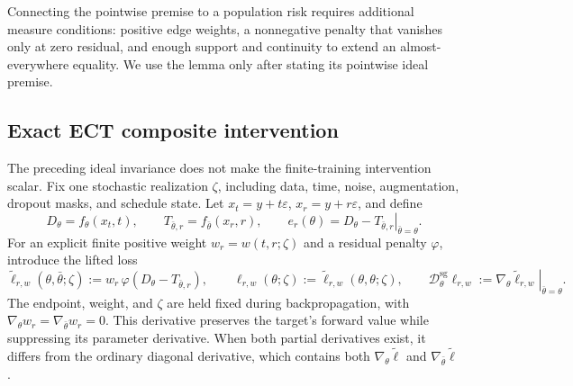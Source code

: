 \documentclass{article}
\newif\ifshowcomments
\newcommand{\theorynote}[1]{%
  \ifshowcomments{\color{theoryblue}\textbf{[THEORY CHECK: #1]}}\fi}
\newcommand{\Dsg}{\mathcal{D}^{\mathrm{sg}}_\theta}
\begin{document}
Connecting the pointwise premise to a population risk requires additional
measure conditions: positive edge weights, a nonnegative penalty that vanishes
only at zero residual, and enough support and continuity to extend an
almost-everywhere equality. We use the lemma only after stating its pointwise
ideal premise.

\theorynote{Keep the lemma on latent trajectories and retain the asymptotic
anchor case. Do not silently upgrade feasibility of zero pathwise residuals
into a property of the actual ECT population minimizer.}

\subsection{Exact ECT composite intervention}
\label{sec:theory-composite-intervention}

The preceding ideal invariance does not make the finite-training intervention
scalar. Fix one stochastic realization $\zeta$, including data, time, noise,
augmentation, dropout masks, and schedule state. Let
$x_t=y+t\varepsilon$, $x_r=y+r\varepsilon$, and define
\begin{equation}
  D_\theta=f_\theta(x_t,t),\qquad
  T_{\bar\theta,r}=f_{\bar\theta}(x_r,r),\qquad
  e_r(\theta)=D_\theta-
  \left.T_{\bar\theta,r}\right|_{\bar\theta=\theta}.
  \label{eq:ect-residual}
\end{equation}
For an explicit finite positive weight $w_r=w(t,r;\zeta)$ and a residual
penalty $\varphi$, introduce the lifted loss
\begin{equation}
  \widetilde\ell_{r,w}(\theta,\bar\theta;\zeta)
  :=w_r\,\varphi\!\left(D_\theta-T_{\bar\theta,r}\right),
  \qquad
  \ell_{r,w}(\theta;\zeta)
  :=\widetilde\ell_{r,w}(\theta,\theta;\zeta),
  \qquad
  \Dsg\ell_{r,w}
  :=\left.\nabla_\theta\widetilde\ell_{r,w}
  \right|_{\bar\theta=\theta}.
  \label{eq:sg-training-derivative}
\end{equation}
The endpoint, weight, and $\zeta$ are held fixed during backpropagation, with
$\nabla_\theta w_r=\nabla_{\bar\theta}w_r=0$. This derivative preserves the
target's forward value while suppressing its parameter derivative. When both
partial derivatives exist, it differs from the ordinary diagonal derivative,
which contains both $\nabla_\theta\widetilde\ell$ and
$\nabla_{\bar\theta}\widetilde\ell$.
\end{document}
